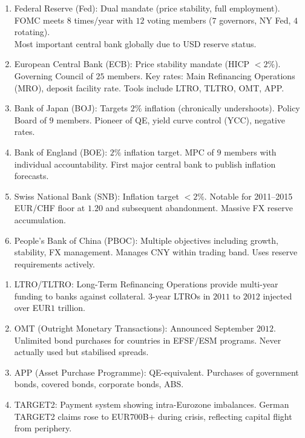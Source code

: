 \begin{remark} 
\begin{enumerate}[label=\roman*.]
\setlength{\itemsep}{0pt}
\item Federal Reserve (Fed): Dual mandate (price stability, full employment). FOMC meets $8$ times/year with $12$ voting members ($7$ governors, NY Fed, $4$ rotating).\\
Most important central bank globally due to USD reserve status.
\item European Central Bank (ECB): Price stability mandate (HICP $<2\%$). Governing Council of $25$ members. Key rates: Main Refinancing Operations (MRO), deposit facility rate. Tools include LTRO, TLTRO, OMT, APP.
\item Bank of Japan (BOJ): Targets $2\%$ inflation (chronically undershoots). Policy Board of $9$ members. Pioneer of QE, yield curve control (YCC), negative rates.
\item Bank of England (BOE): $2\%$ inflation target. MPC of $9$ members with individual accountability. First major central bank to publish inflation forecasts.
\item Swiss National Bank (SNB): Inflation target $<2\%$. Notable for 2011--2015 EUR/CHF floor at $1.20$ and subsequent abandonment. Massive FX reserve accumulation.
\item People's Bank of China (PBOC): Multiple objectives including growth, stability, FX management. Manages CNY within trading band. Uses reserve requirements actively.
\end{enumerate}
\end{remark}

\begin{remark} 
\begin{enumerate}[label=\roman*.]
\setlength{\itemsep}{0pt}
\item LTRO/TLTRO: Long-Term Refinancing Operations provide multi-year funding to banks against collateral. $3$-year LTROs in $2011$ to $2012$ injected over EUR$1$ trillion.
\item OMT (Outright Monetary Transactions): Announced September $2012$. Unlimited bond purchases for countries in EFSF/ESM programs. Never actually used but stabilised spreads.
\item APP (Asset Purchase Programme): QE-equivalent. Purchases of government bonds, covered bonds, corporate bonds, ABS.
\item TARGET2: Payment system showing intra-Eurozone imbalances. German TARGET2 claims rose to EUR$700$B+ during crisis, reflecting capital flight from periphery.
\end{enumerate}
\end{remark}

